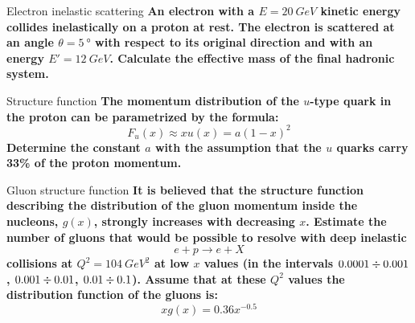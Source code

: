 \documentclass[../../main/main.tex]{subfiles}
\begin{document}
\bigskip
\begin{exercise}{Electron inelastic scattering}{}
	\textbf{An electron with a \( E=20 \ \si{GeV} \) kinetic energy collides inelastically on a proton at rest. The electron is scattered at an angle \( \theta = 5 \ \si{°} \) with respect to its original direction and with an energy \( E'=12 \ \si{GeV} \). Calculate the effective mass of the final hadronic system.}

	\medskip
\end{exercise}





\bigskip
\begin{exercise}{Structure function}{}
	\textbf{The momentum distribution of the \( u \)-type quark in the proton can be parametrized by the formula:}\
	\begin{equation}
		F_u(x)
		\approx
		xu(x)
		=
		a(1-x)^2
		\label{eq:}
	\end{equation}
	\textbf{Determine the constant \( a \) with the assumption that the \( u \) quarks carry 33\% of the proton momentum.}

	\medskip
\end{exercise}





\bigskip
\begin{exercise}{Gluon structure function}{}
	\textbf{It is believed that the structure function describing the distribution of the gluon momentum inside the nucleons, \( g(x) \), strongly increases with decreasing \( x \). Estimate the number of gluons that would be possible to resolve with deep inelastic}
	\begin{equation}
		e + p \longrightarrow e + X
		\label{eq:}
	\end{equation}
	\textbf{collisions at \( Q^2=104 \ \si{GeV^2} \) at low \( x \) values (in the intervals \( 0.0001 \divisionsymbol 0.001 \), \( 0.001 \divisionsymbol 0.01 \), \( 0.01 \divisionsymbol 0.1 \)). Assume that at these \( Q^2 \) values the distribution function of the gluons is:}
	\begin{equation}
		xg(x)
		=
		0.36x^{-0.5}
		\label{eq:}
	\end{equation}

	\medskip
\end{exercise}
\end{document}
